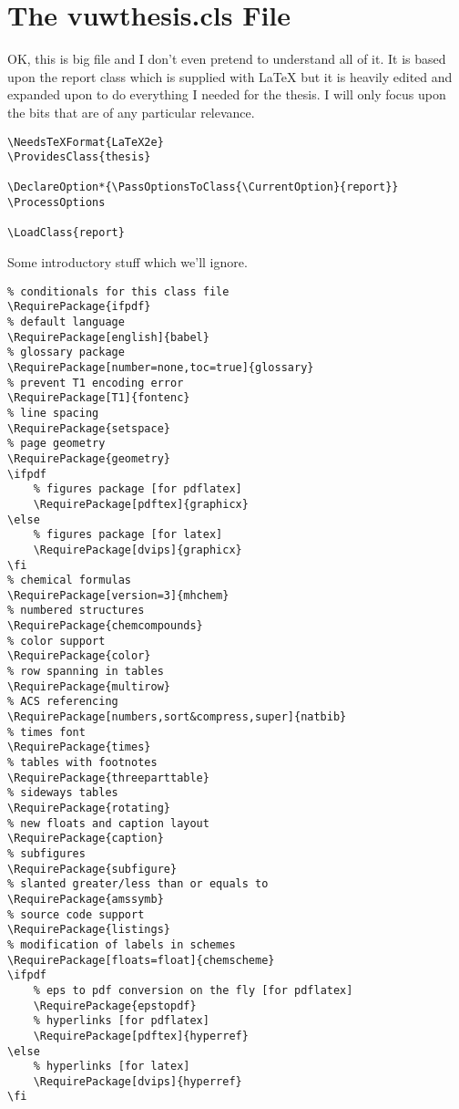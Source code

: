 
\chapter{The vuwthesis.cls File}
\label{ch:thesiscls}

OK, this is big file and I don't even pretend to understand all of it.  It is based upon the report class which is supplied with \LaTeX{} but it is heavily edited and expanded upon to do everything I needed for the thesis.  I will only focus upon the bits that are of any particular relevance.

\small\singlespacing
\begin{verbatim}
\NeedsTeXFormat{LaTeX2e}
\ProvidesClass{thesis}

\DeclareOption*{\PassOptionsToClass{\CurrentOption}{report}}
\ProcessOptions

\LoadClass{report}
\end{verbatim}

\normalsize\doublespacing
Some introductory stuff which we'll ignore.

\small\singlespacing
\begin{verbatim}
% conditionals for this class file
\RequirePackage{ifpdf}
% default language
\RequirePackage[english]{babel}
% glossary package
\RequirePackage[number=none,toc=true]{glossary}
% prevent T1 encoding error
\RequirePackage[T1]{fontenc}
% line spacing
\RequirePackage{setspace}
% page geometry
\RequirePackage{geometry}
\ifpdf
	% figures package [for pdflatex]
	\RequirePackage[pdftex]{graphicx}
\else
	% figures package [for latex]
	\RequirePackage[dvips]{graphicx}
\fi
% chemical formulas
\RequirePackage[version=3]{mhchem}
% numbered structures
\RequirePackage{chemcompounds}
% color support
\RequirePackage{color}
% row spanning in tables
\RequirePackage{multirow}
% ACS referencing
\RequirePackage[numbers,sort&compress,super]{natbib}
% times font
\RequirePackage{times}
% tables with footnotes
\RequirePackage{threeparttable}
% sideways tables
\RequirePackage{rotating}
% new floats and caption layout
\RequirePackage{caption}
% subfigures
\RequirePackage{subfigure}
% slanted greater/less than or equals to
\RequirePackage{amssymb}
% source code support
\RequirePackage{listings}
% modification of labels in schemes
\RequirePackage[floats=float]{chemscheme}
\ifpdf
	% eps to pdf conversion on the fly [for pdflatex]
	\RequirePackage{epstopdf}
	% hyperlinks [for pdflatex]
	\RequirePackage[pdftex]{hyperref}
\else
	% hyperlinks [for latex]
	\RequirePackage[dvips]{hyperref}
\fi
\end{verbatim}

